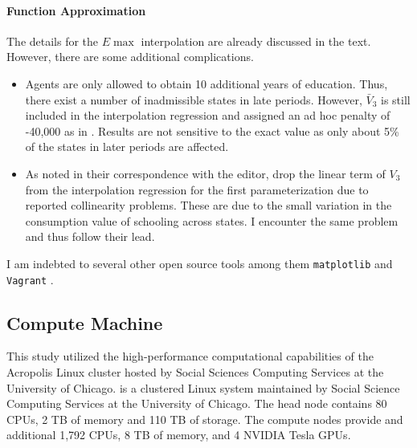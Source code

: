 \paragraph{Function Approximation} The details for the $E\max$ interpolation are already discussed in the text. However, there are some additional complications.
%
\begin{itemize}
\item Agents are only allowed to obtain 10 additional years of education. Thus, there exist a number of inadmissible states in late periods. However, $\bar{V}_3$ is still included in the interpolation regression and assigned an ad hoc penalty of -40,000 as in \citet{Keane.1994}. Results are not sensitive to the exact value as only about 5\% of the states in later periods are affected.
\item As noted in their correspondence with the editor, \citet{Keane.1994} drop the linear term of $V_3$ from the interpolation regression for the first parameterization due to reported collinearity problems. These are due to the small variation in the consumption value of schooling across states. I encounter the same problem and thus follow their lead.
\end{itemize}

I am indebted to several other open source tools among them \texttt{matplotlib} \citep{Matplotlib.2007} and \texttt{Vagrant} \citep{Hashimoto.2013}.
\subsection{Compute Machine}
\noindent This study utilized the high-performance computational capabilities of the Acropolis Linux cluster hosted by Social Sciences Computing Services at the University of Chicago.  is a clustered Linux system maintained by Social Science Computing Services at the University of Chicago. The head node contains 80 CPUs, 2 TB of memory and 110 TB of storage. The compute nodes provide and additional 1,792 CPUs, 8 TB of memory, and 4 NVIDIA Tesla GPUs.
